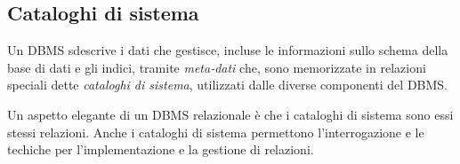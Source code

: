 \subsection{Cataloghi di sistema}%
\label{sub:Cataloghi di sistema}
Un DBMS sdescrive i dati che gestisce, incluse le informazioni sullo schema
della base di dati e gli indici, tramite \emph{meta-dati} che, sono memorizzate
in relazioni speciali dette \emph{cataloghi di sistema}, utilizzati dalle
diverse componenti del DBMS.

Un aspetto elegante di un DBMS relazionale è che i cataloghi di sistema sono
essi stessi relazioni.
Anche i cataloghi di sistema permettono l'interrogazione e le techiche per
l'implementazione e la gestione di relazioni.
